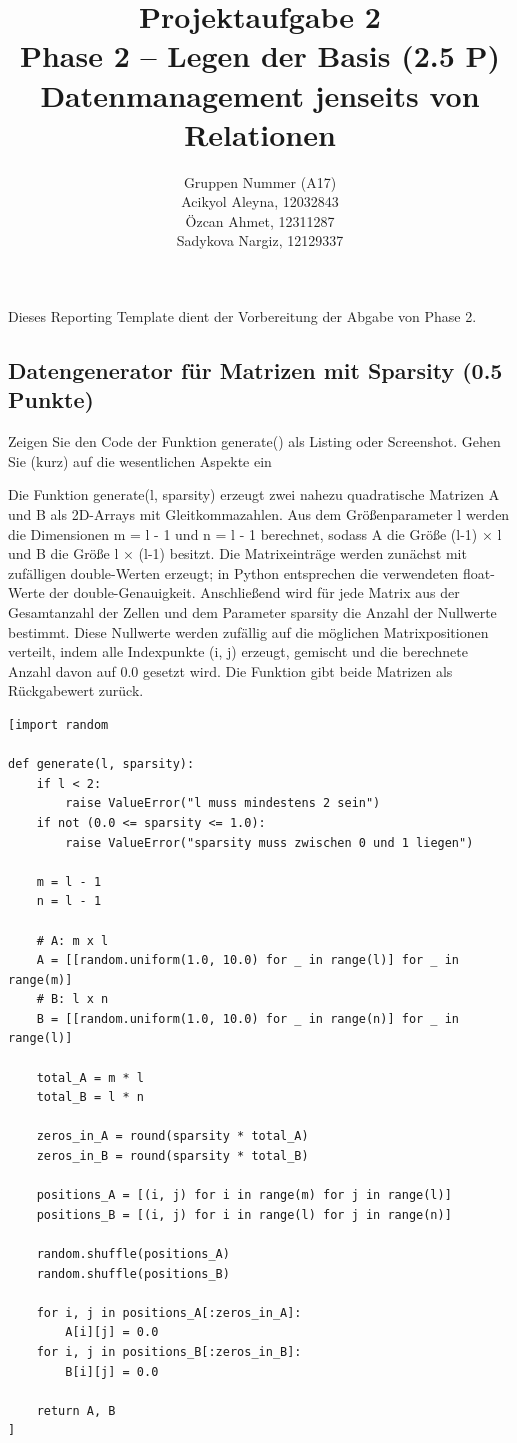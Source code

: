 \documentclass[11pt]{scrartcl}
\title{
  \textbf{\large Projektaufgabe 2 } \\
  Phase 2 – Legen der Basis (2.5 P) \\
  {\large Datenmanagement jenseits von Relationen}
}
\author{
  Gruppen Nummer (A17) \\
  \large Acikyol Aleyna, 12032843 \\
  \large Özcan Ahmet, 12311287 \\
  \large Sadykova Nargiz, 12129337 \\
  
}
\begin{document}
\maketitle\thispagestyle{empty}

Dieses Reporting Template dient der Vorbereitung der Abgabe von Phase 2.

\subsection*{Datengenerator für Matrizen mit Sparsity (0.5 Punkte)}

Zeigen Sie den Code der Funktion generate() als Listing oder Screenshot. Gehen Sie
(kurz) auf die wesentlichen Aspekte ein

{Die Funktion generate(l, sparsity) erzeugt zwei nahezu quadratische Matrizen A und B als 2D-Arrays mit Gleitkommazahlen. Aus dem Größenparameter l werden die Dimensionen m = l - 1 und n = l - 1 berechnet, sodass A die Größe (l-1) × l und B die Größe l × (l-1) besitzt. Die Matrixeinträge werden zunächst mit zufälligen double-Werten erzeugt; in Python entsprechen die verwendeten float-Werte der double-Genauigkeit. Anschließend wird für jede Matrix aus der Gesamtanzahl der Zellen und dem Parameter sparsity die Anzahl der Nullwerte bestimmt. Diese Nullwerte werden zufällig auf die möglichen Matrixpositionen verteilt, indem alle Indexpunkte (i, j) erzeugt, gemischt und die berechnete Anzahl davon auf 0.0 gesetzt wird. Die Funktion gibt beide Matrizen als Rückgabewert zurück.}

\begin{lstlisting}[style=dmrsql]
[import random

def generate(l, sparsity):
    if l < 2:
        raise ValueError("l muss mindestens 2 sein")
    if not (0.0 <= sparsity <= 1.0):
        raise ValueError("sparsity muss zwischen 0 und 1 liegen")

    m = l - 1
    n = l - 1

    # A: m x l
    A = [[random.uniform(1.0, 10.0) for _ in range(l)] for _ in range(m)]
    # B: l x n
    B = [[random.uniform(1.0, 10.0) for _ in range(n)] for _ in range(l)]

    total_A = m * l
    total_B = l * n

    zeros_in_A = round(sparsity * total_A)
    zeros_in_B = round(sparsity * total_B)

    positions_A = [(i, j) for i in range(m) for j in range(l)]
    positions_B = [(i, j) for i in range(l) for j in range(n)]

    random.shuffle(positions_A)
    random.shuffle(positions_B)

    for i, j in positions_A[:zeros_in_A]:
        A[i][j] = 0.0
    for i, j in positions_B[:zeros_in_B]:
        B[i][j] = 0.0

    return A, B
]
\end{lstlisting}
\end{document}
